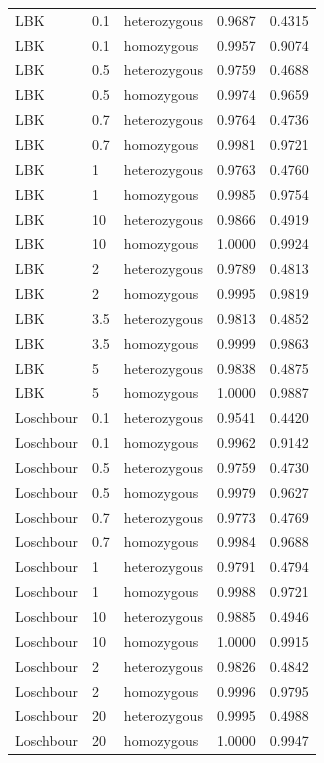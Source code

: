 {\begin{longtable}[t]{lllrr}
\endfoot
\bottomrule
\endlastfoot
LBK & 0.1 & heterozygous & 0.9687 & 0.4315\\
LBK & 0.1 & homozygous & 0.9957 & 0.9074\\
LBK & 0.5 & heterozygous & 0.9759 & 0.4688\\
LBK & 0.5 & homozygous & 0.9974 & 0.9659\\
LBK & 0.7 & heterozygous & 0.9764 & 0.4736\\
LBK & 0.7 & homozygous & 0.9981 & 0.9721\\
LBK & 1 & heterozygous & 0.9763 & 0.4760\\
LBK & 1 & homozygous & 0.9985 & 0.9754\\
LBK & 10 & heterozygous & 0.9866 & 0.4919\\
LBK & 10 & homozygous & 1.0000 & 0.9924\\
LBK & 2 & heterozygous & 0.9789 & 0.4813\\
LBK & 2 & homozygous & 0.9995 & 0.9819\\
LBK & 3.5 & heterozygous & 0.9813 & 0.4852\\
LBK & 3.5 & homozygous & 0.9999 & 0.9863\\
LBK & 5 & heterozygous & 0.9838 & 0.4875\\
LBK & 5 & homozygous & 1.0000 & 0.9887\\
Loschbour & 0.1 & heterozygous & 0.9541 & 0.4420\\
Loschbour & 0.1 & homozygous & 0.9962 & 0.9142\\
Loschbour & 0.5 & heterozygous & 0.9759 & 0.4730\\
Loschbour & 0.5 & homozygous & 0.9979 & 0.9627\\
Loschbour & 0.7 & heterozygous & 0.9773 & 0.4769\\
Loschbour & 0.7 & homozygous & 0.9984 & 0.9688\\
Loschbour & 1 & heterozygous & 0.9791 & 0.4794\\
Loschbour & 1 & homozygous & 0.9988 & 0.9721\\
Loschbour & 10 & heterozygous & 0.9885 & 0.4946\\
Loschbour & 10 & homozygous & 1.0000 & 0.9915\\
Loschbour & 2 & heterozygous & 0.9826 & 0.4842\\
Loschbour & 2 & homozygous & 0.9996 & 0.9795\\
Loschbour & 20 & heterozygous & 0.9995 & 0.4988\\
Loschbour & 20 & homozygous & 1.0000 & 0.9947\\

\end{longtable}}
